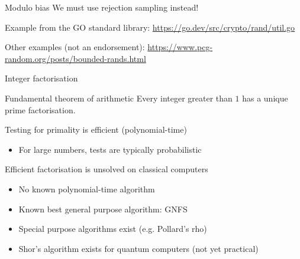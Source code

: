 \begin{frame}{Modulo bias}
  \pause
  We must use \alert{rejection sampling} instead!

  \vspace*{1em}

  \pause
  Example from the GO standard library:
  \url{https://go.dev/src/crypto/rand/util.go}

  \vspace*{1em}

  \pause
  Other examples (not an endorsement):
  \url{https://www.pcg-random.org/posts/bounded-rands.html}
\end{frame}

\begin{frame}{Integer factorisation}
  \pause
  \begin{block}{Fundamental theorem of arithmetic}
    Every integer greater than $1$ has a unique prime factorisation.
  \end{block}

  \pause
  Testing for primality is efficient (polynomial-time)
  \pause
  \begin{itemize}
    \item For large numbers, tests are typically probabilistic
  \end{itemize}
  
  \pause
  Efficient factorisation is unsolved on classical computers
  \begin{itemize}[<+(1)->]
    \item No known polynomial-time algorithm
    \item Known best general purpose algorithm: GNFS
    \item Special purpose algorithms exist (e.g. Pollard's rho)
    \item Shor's algorithm exists for quantum computers (not yet practical)
  \end{itemize}
\end{frame}

